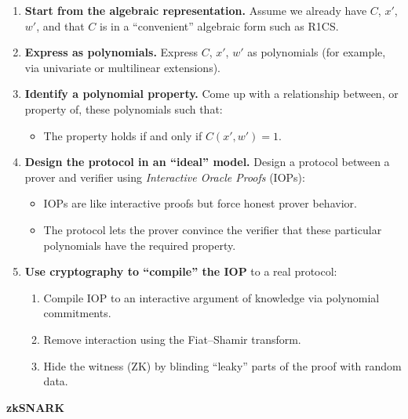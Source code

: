\documentclass[11pt]{article}
\begin{document}
\begin{enumerate}
  \item \textbf{Start from the algebraic representation.} Assume we already have $C$, $x'$, $w'$,
        and that $C$ is in a ``convenient'' algebraic form such as R1CS.

  \item \textbf{Express as polynomials.} Express $C$, $x'$, $w'$ as polynomials (for example, via
        univariate or multilinear extensions).

  \item \textbf{Identify a polynomial property.} Come up with a relationship between, or property of,
        these polynomials such that:
        \begin{itemize}
          \item The property holds if and only if $C(x', w') = 1$.
        \end{itemize}

  \item \textbf{Design the protocol in an ``ideal'' model.} Design a protocol between a prover and
        verifier using \emph{Interactive Oracle Proofs} (IOPs):
        \begin{itemize}
          \item IOPs are like interactive proofs but force honest prover behavior.
          \item The protocol lets the prover convince the verifier that these particular polynomials
                have the required property.
        \end{itemize}

  \item \textbf{Use cryptography to ``compile'' the IOP} to a real protocol:
        \begin{enumerate}
          \item Compile IOP to an interactive argument of knowledge via polynomial commitments.
          \item Remove interaction using the Fiat--Shamir transform.
          \item Hide the witness (ZK) by blinding ``leaky'' parts of the proof with random data.
        \end{enumerate}
\end{enumerate}

\begin{tcolorbox}[colback=gray!10, colframe=gray!60, title={Handwritten annotation: result of this pipeline}]
  \centerline{\textbf{zkSNARK}}
\end{tcolorbox}
\end{document}
